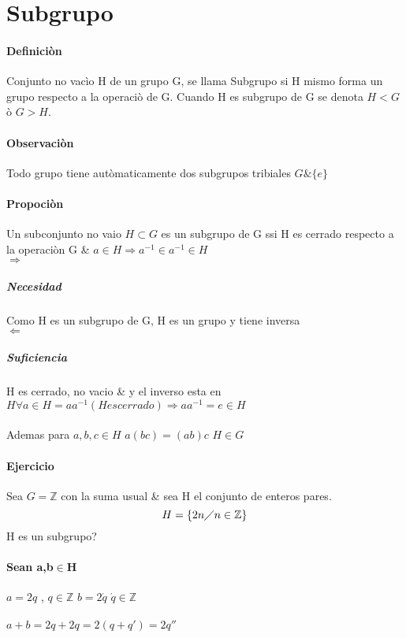 \newpage
\section{Subgrupo}
\paragraph{Definici\`on}
  Conjunto no vac\`io H de un grupo G, se llama Subgrupo si H mismo forma un grupo respecto a la operaci\`{o} de G.
  Cuando H es subgrupo de G se denota $H< G$  \`{o} $G> H$.
  \paragraph{Observaci\`on}
  Todo grupo tiene aut\`omaticamente dos subgrupos tribiales  $G \& \{ e \} $
    \paragraph{Propoci\`on}
  Un subconjunto no vaio $H\subset G$ es un subgrupo de G ssi H es cerrado respecto a la operaci\`{o}n G \& $a\in H\Rightarrow a^{-1}\in a^{-1}\in H$ 
  \\ $\Rightarrow$ \subparagraph{Necesidad} Como H es un subgrupo de G, H es un grupo y tiene inversa
  \\  $\Leftarrow$ \subparagraph{Suficiencia} H es cerrado, no vacio \& y el  inverso esta en $H\forall a\in H=aa^{-1}(H es cerrado)\Rightarrow aa^{-1}=e\in H$ 
  \\
  \\ Ademas para $a,b,c\in H$  $a(bc)=(ab)c$ $H\in G$

  \paragraph{Ejercicio} Sea $G=\mathbb{Z} $ con la  suma usual \& sea H el conjunto de enteros pares.
  \\ \[H=\{2n\diagup n\in \mathbb{Z} \}   \] H es un subgrupo?
  \paragraph{Sean a,b$\in$H} 
  $a=2q$ , $q\in \mathbb{Z} $  $b=2\acute{q}$ $\acute{q}\in \mathbb{Z}  $
  \\
  \\ $a+b=2q+2q=2(q+q')=2q'' $
  
